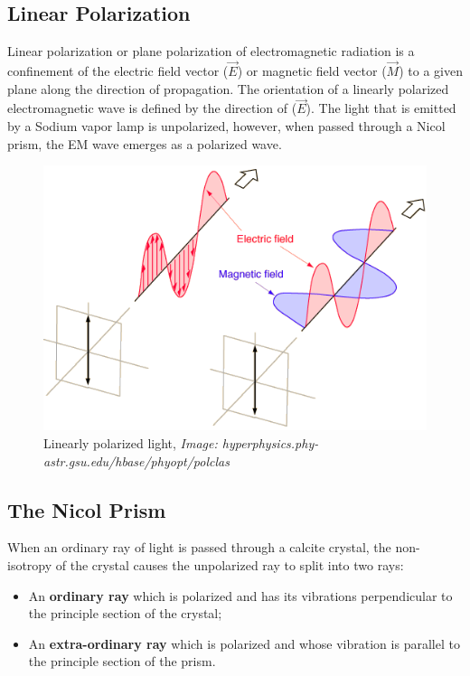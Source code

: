 \documentclass{dkpinto-report}
\begin{document}
\subsection{Linear Polarization}
Linear polarization or plane polarization of electromagnetic radiation is a confinement of the electric field vector ($\vec{E}$) or magnetic field vector ($\vec{M}$) to a given plane along the direction of propagation. The orientation of a linearly polarized electromagnetic wave is defined by the direction of ($\vec{E}$). The light that is emitted by a Sodium vapor lamp is unpolarized, however, when passed through a Nicol prism, the EM wave emerges as a polarized wave. 

\begin{figure}[h] \label{img:1} %
\caption{Linearly polarized light, \textit{Image: hyperphysics.phy-astr.gsu.edu/hbase/phyopt/polclas}}
\centering
\includegraphics[scale=0.4]{Images/Lin_Pol.png}
\end{figure}

\subsection{The Nicol Prism}
When an ordinary ray of light is passed through a calcite crystal, the non-isotropy of the crystal causes the unpolarized ray to split into two rays:

\begin{itemize}
\item An \textbf{ordinary ray} which is polarized and has its vibrations perpendicular to the principle section of the crystal;
\item An \textbf{extra-ordinary ray} which is polarized and whose vibration is parallel to the principle section of the prism.
\end{itemize}
\end{document}

